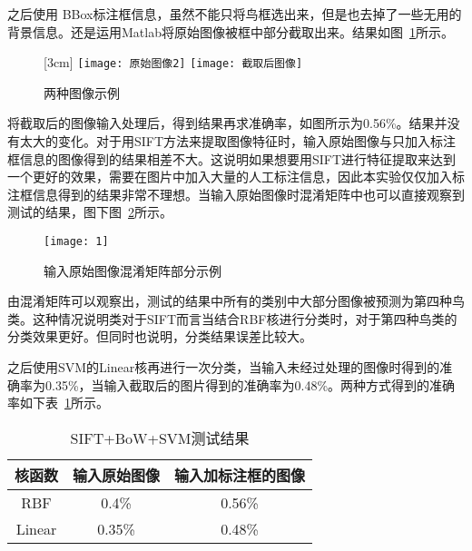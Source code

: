 之后使用 BBox标注框信息，虽然不能只将鸟框选出来，但是也去掉了一些无用的背景信息。还是运用Matlab将原始图像被框中部分截取出来。结果如图~\ref{fig:jiequyuanshi}所示。
\begin{figure}[H]
  \centering%
  [3cm] %
    {\texttt{[image: 原始图像2]}}%
  \qquad \qquad \qquad \qquad %
      {\texttt{[image: 截取后图像]}}
  \caption{两种图像示例}
  \label{fig:jiequyuanshi}
\end{figure}
将截取后的图像输入处理后，得到结果再求准确率，如图所示为0.56\%。结果并没有太大的变化。对于用SIFT方法来提取图像特征时，输入原始图像与只加入标注框信息的图像得到的结果相差不大。这说明如果想要用SIFT进行特征提取来达到一个更好的效果，需要在图片中加入大量的人工标注信息，因此本实验仅仅加入标注框信息得到的结果非常不理想。当输入原始图像时混淆矩阵中也可以直接观察到测试的结果，图下图~\ref{fig:siftrbf}所示。
\begin{figure}[H] %
  \centering
  \texttt{[image: 1]}
  \caption{输入原始图像混淆矩阵部分示例}
  \label{fig:siftrbf}
\end{figure}
由混淆矩阵可以观察出，测试的结果中所有的类别中大部分图像被预测为第四种鸟类。这种情况说明类对于SIFT而言当结合RBF核进行分类时，对于第四种鸟类的分类效果更好。但同时也说明，分类结果误差比较大。

之后使用SVM的Linear核再进行一次分类，当输入未经过处理的图像时得到的准确率为0.35\%，当输入截取后的图片得到的准确率为0.48\%。两种方式得到的准确率如下表~\ref{tab:siftbowsvm}所示。

\begin{table}[htb]
 \centering
  \begin{minipage}[t]{0.6\linewidth} %
  \caption{SIFT+BoW+SVM测试结果}
  \label{tab:siftbowsvm}
   \begin{tabularx}{\linewidth}{c|c|c}
     \toprule[1.5pt]
      核函数 &  输入原始图像  &  输入加标注框的图像\\
     \hline
      RBF & 0.4\% & 0.56\%  \\\hline
      Linear & 0.35\% & 0.48\%  \\
      \bottomrule[1.5pt]
    \end{tabularx}
  \end{minipage}
\end{table}

